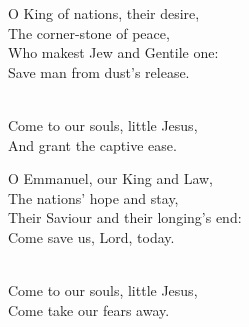 \begin{lyrics}
O King of nations, their desire,\\
The corner-stone of peace,\\
Who makest Jew and Gentile one:\\
Save man from dust’s release.

\\
Come to our souls, little Jesus,\\
And grant the captive ease.

O Emmanuel, our King and Law,\\
The nations’ hope and stay,\\
Their Saviour and their longing’s end:\\
Come save us, Lord, today.

\\
Come to our souls, little Jesus,\\
Come take our fears away.
\end{lyrics}

